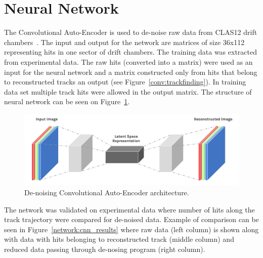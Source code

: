 \section{Neural Network}

The Convolutional Auto-Encoder is used to de-noise raw data from CLAS12 drift chambers~\cite{Thomadakis:2022zcd}. The input and output for the network are 
matrices of size 36x112 representing hits in one sector of drift chambers. 
The training data was extracted from experimental data. The raw hits (converted 
into a matrix) were used as an input for the neural network and a matrix constructed 
only from hits that belong to reconstructed tracks an output (see Figure~\ref{conv:trackfinding}). 
In training data set multiple track hits were allowed in the output matrix. The structure 
of neural network can be seen on Figure~\ref{network:cnn_encoder}.

\begin{figure}[!h]
\begin{center}
 \includegraphics[width=5.1in]{images/convolutional-autoencoder.png}
\caption {De-noising Convolutional Auto-Encoder architecture. }
 \label{network:cnn_encoder}
 \end{center}
\end{figure}

The network was validated on experimental data where number of hits along the 
track trajectory were compared for de-noised data. Example of comparison can 
be seen in Figure~\ref{network:cnn_results} where raw data (left column) is shown 
along with data with hits belonging to reconstructed track (middle column) and 
reduced data passing through de-nosing program (right column).

